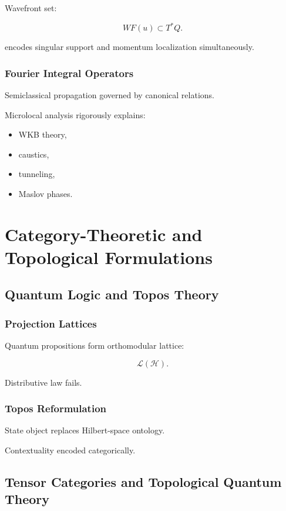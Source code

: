 \documentclass[11pt]{book}
\begin{document}
Wavefront set:

\[
WF(u)
\subset
T^*Q.
\]

encodes singular support and momentum localization simultaneously.

\section{Fourier Integral Operators}

Semiclassical propagation governed by canonical relations.

Microlocal analysis rigorously explains:

\begin{itemize}
\item WKB theory,
\item caustics,
\item tunneling,
\item Maslov phases.
\end{itemize}

\part{Category-Theoretic and Topological Formulations}

\chapter{Quantum Logic and Topos Theory}

\section{Projection Lattices}

Quantum propositions form orthomodular lattice:

\[
\mathcal L(\mathcal H).
\]

Distributive law fails.

\section{Topos Reformulation}

State object replaces Hilbert-space ontology.

Contextuality encoded categorically.

\chapter{Tensor Categories and Topological Quantum Theory}
\end{document}
